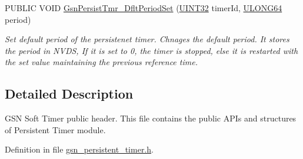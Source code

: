 \begin{DoxyCompactItemize}
PUBLIC VOID \hyperlink{a00671_ga72f5225fa0da29f815d14a417c29611e}{GsnPersistTmr\_\-DfltPeriodSet} (\hyperlink{a00660_gae1e6edbbc26d6fbc71a90190d0266018}{UINT32} timerId, \hyperlink{a00660_ga28961430434ccabca6862ea93fe9a15b}{ULONG64} period)
\begin{DoxyCompactList}\small\item\em Set default period of the persistenet timer. Chnages the default period. It stores the period in NVDS, If it is set to 0, the timer is stopped, else it is restarted with the set value maintaining the previous reference time. \end{DoxyCompactList}\end{DoxyCompactItemize}


\subsection{Detailed Description}
GSN Soft Timer public header. This file contains the public APIs and structures of Persistent Timer module. 

Definition in file \hyperlink{a00539_source}{gsn\_\-persistent\_\-timer.h}.

